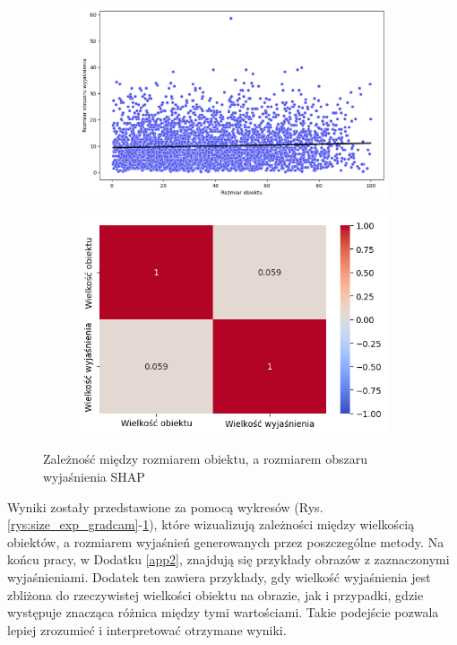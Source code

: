 \begin{figure}[h]
	\centering
	\begin{subfigure}[b]{0.45\textwidth}
		\includegraphics[width=.9\textwidth]{img/size_exp_shap}
	\end{subfigure}
	\begin{subfigure}[b]{0.45\textwidth}
		\includegraphics[width=.9\textwidth]{img/size_exp_shap_corr}
	\end{subfigure}
	\caption{Zależność między rozmiarem obiektu, a rozmiarem obszaru wyjaśnienia SHAP}
	\label{rys:size_exp_shap}
\end{figure}

Wyniki zostały przedstawione za pomocą wykresów (Rys. \ref{rys:size_exp_gradcam}-\ref{rys:size_exp_shap}), które wizualizują zależności między wielkością obiektów, a rozmiarem wyjaśnień generowanych przez poszczególne metody.
Na końcu pracy, w Dodatku \ref{app2}, znajdują się przykłady obrazów z zaznaczonymi wyjaśnieniami.
Dodatek ten zawiera przykłady, gdy wielkość wyjaśnienia jest zbliżona do rzeczywistej wielkości obiektu na obrazie, jak i przypadki, gdzie występuje znacząca różnica między tymi wartościami.
Takie podejście pozwala lepiej zrozumieć i interpretować otrzymane wyniki.

